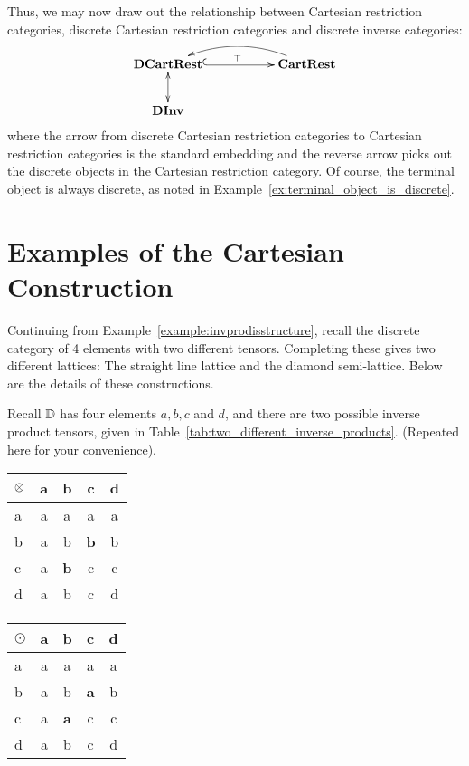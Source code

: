 Thus, we may now draw out the relationship between Cartesian restriction categories, discrete
Cartesian restriction categories and discrete inverse categories:

\[
  \xymatrix{
    \text{\textbf{DCartRest}} \ar@{^{(}->}[rr]^{\top} && \text{\textbf{CartRest}} \ar@/_15pt/[ll]\\
    \text{\textbf{DInv}}\ar@{<->}[u]
  }
\]
where the arrow from discrete Cartesian restriction categories to Cartesian restriction categories
is the standard embedding and the reverse arrow picks out the discrete objects in the Cartesian
restriction category. Of course, the terminal object is always discrete, as noted in
Example~\ref{ex:terminal_object_is_discrete}.

\section{Examples of the Cartesian Construction} %
\label{sec:examples_of_the_wtf_construction}

\begin{example}
  \label{example:completing_a_finite_discrete_inverse_category}
\end{example}
Continuing from Example~\ref{example:invprodisstructure}, recall the discrete category of 4
elements with two different tensors. Completing these gives two different lattices:
The straight line lattice and the diamond semi-lattice. Below are the details of these constructions.

Recall $\mathbb{D}$ has four elements $a,b,c$ and $d$, and there are two possible inverse product tensors,
given in Table~\ref{tab:two_different_inverse_products}. (Repeated here for your convenience).
\begin{table*}[!htbp]
  \begin{center}
  \begin{tabular}{|l||c|c|c|c|}
    \hline
    $\otimes$&a&b&c&d\\ \hline \hline
    a&a&a&a&a\\ \hline
    b&a&b&\textbf{b}&b\\ \hline
    c&a&\textbf{b}&c&c \\ \hline
    d&a&b&c&d \\ \hline
  \end{tabular}
  \qquad
  \begin{tabular}{|l||c|c|c|c|} \hline
    $\odot$&a&b&c&d\\ \hline \hline
    a&a&a&a&a\\ \hline
    b&a&b&\textbf{a}&b\\ \hline
    c&a&\textbf{a}&c&c \\ \hline
    d&a&b&c&d \\ \hline
  \end{tabular}
  \end{center}
  \caption[]{Two different inverse products on the same category.} %
\end{table*}


